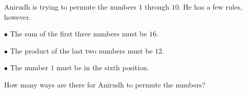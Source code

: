 Anirudh is trying to permute the numbers $1$ through $10$. He has a few rules, however.

$\bullet$ The sum of the first three numbers must be $16$.

$\bullet$ The product of the last two numbers must be $12$.

$\bullet$ The number $1$ must be in the sixth position.

How many ways are there for Anirudh to permute the numbers?
